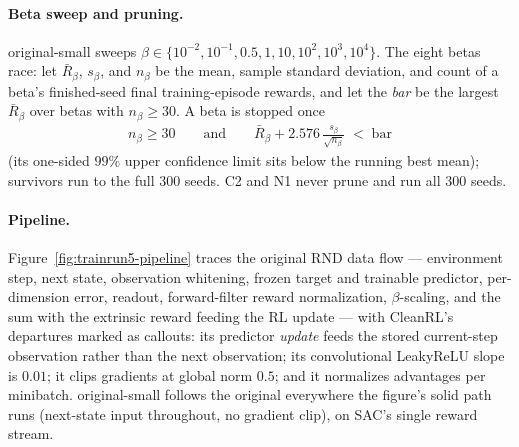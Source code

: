 \paragraph{Beta sweep and pruning.}
original-small sweeps $\beta\in\{10^{-2},10^{-1},0.5,1,10,10^{2},10^{3},10^{4}\}$. The eight betas
race: let $\bar R_\beta$, $s_\beta$, and $n_\beta$ be the mean, sample standard deviation, and count
of a beta's finished-seed final training-episode rewards, and let the \emph{bar} be the largest
$\bar R_\beta$ over betas with $n_\beta\ge 30$. A beta is stopped once
\begin{align}
n_\beta \ge 30
\qquad\text{and}\qquad
\bar R_\beta + 2.576\,\frac{s_\beta}{\sqrt{n_\beta}} \;<\; \mathrm{bar}
\end{align}
(its one-sided $99\%$ upper confidence limit sits below the running best mean); survivors run to the
full $300$ seeds. C2 and N1 never prune and run all $300$ seeds.

\paragraph{Pipeline.}
Figure~\ref{fig:trainrun5-pipeline} traces the original RND data flow --- environment step, next
state, observation whitening, frozen target and trainable predictor, per-dimension error, readout,
forward-filter reward normalization, $\beta$-scaling, and the sum with the extrinsic reward feeding
the RL update --- with CleanRL's departures marked as callouts: its predictor \emph{update} feeds
the stored current-step observation rather than the next observation; its convolutional LeakyReLU
slope is $0.01$; it clips gradients at global norm $0.5$; and it normalizes advantages per
minibatch. original-small follows the original everywhere the figure's solid path runs (next-state
input throughout, no gradient clip), on SAC's single reward stream.

